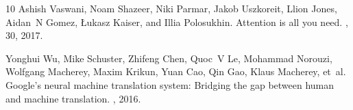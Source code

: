 \documentclass[12pt,a4paper]{article}
\begin{document}
\begin{thebibliography}{10}
Ashish Vaswani, Noam Shazeer, Niki Parmar, Jakob Uszkoreit, Llion Jones,
  Aidan~N Gomez, {\L}ukasz Kaiser, and Illia Polosukhin.
\newblock Attention is all you need.
, 30, 2017.

Yonghui Wu, Mike Schuster, Zhifeng Chen, Quoc~V Le, Mohammad Norouzi, Wolfgang
  Macherey, Maxim Krikun, Yuan Cao, Qin Gao, Klaus Macherey, et~al.
\newblock Google's neural machine translation system: Bridging the gap between
  human and machine translation.
, 2016.

\end{thebibliography}
\end{document}
